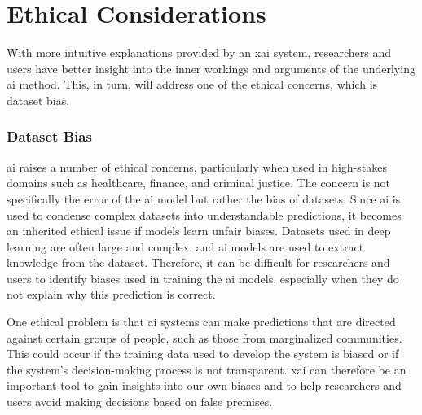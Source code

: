 \label{sec:1_5_ethical_considerations}

\begin{comment}
Ethical considerations in research are a set of principles that guide your research designs and practices. Scientists and researchers must always adhere to a certain code of conduct when collecting data from people. For example, the goals of human research often include understanding real-life phenomena, studying effective treatments, investigating behaviors, and improving lives in other ways. What you decide to research and how you conduct that research involve key ethical considerations such as:

i) protect the rights of research participants (privacy); 
ii) enhance research validity, 
iii) maintain scientific integrity; etc. Thus include here a short description of an assessment of any relevant potential ethical considerations.
\end{comment}

\section{Ethical Considerations}



With more intuitive explanations provided by an \gls{xai} system, researchers and users have better insight into the inner workings and arguments of the underlying \gls{ai} method. This, in turn, will address one of the ethical concerns, which is dataset bias. 

\subsubsection{Dataset Bias}
\gls{ai} raises a number of ethical concerns, particularly when used in high-stakes domains such as healthcare, finance, and criminal justice. The concern is not specifically the error of the \gls{ai} model but rather the bias of datasets. Since \gls{ai} is used to condense complex datasets into understandable predictions, it becomes an inherited ethical issue if models learn unfair biases. 
Datasets used in deep learning are often large and complex, and \gls{ai} models are used to extract knowledge from the dataset. Therefore, it can be difficult for researchers and users to identify biases used in training the \gls{ai} models, especially when they do not explain why this prediction is correct. 

One ethical problem is that \gls{ai} systems can make predictions that are directed against certain groups of people, such as those from marginalized communities. This could occur if the training data used to develop the system is biased or if the system's decision-making process is not transparent. \gls{xai} can therefore be an important tool to gain insights into our own biases and to help researchers and users avoid making decisions based on false premises. 


